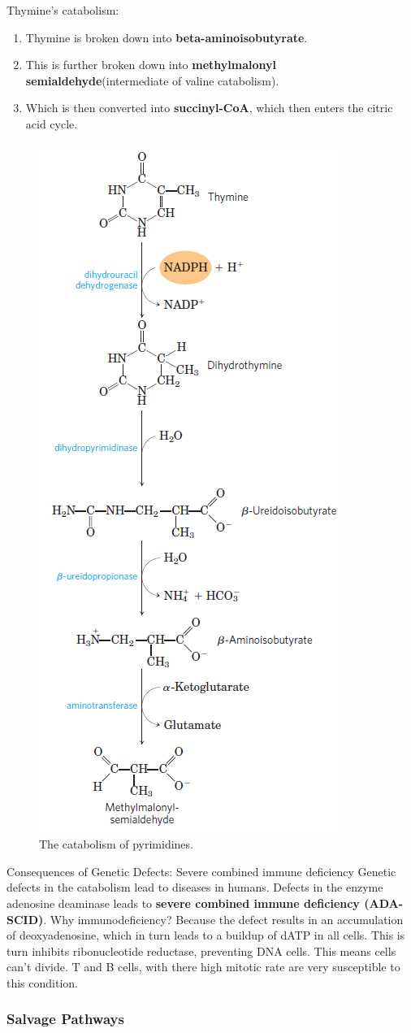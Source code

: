 \documentclass[../main.tex]{subfiles}
\begin{document}
Thymine's catabolism:
\begin{enumerate}
	\item Thymine is broken down into \textbf{\gls{beta-aminoisobutyrate}}.
	\item This is further broken down into \textbf{\gls{methylmalonyl semialdehyde}}(intermediate of valine catabolism).
	\item Which is then converted into \textbf{\gls{succinyl-CoA}}, which then enters the citric acid cycle.
\end{enumerate}

\begin{figure}[H]
	\centering
	\includegraphics[width=0.3\linewidth]{pyr_dis}
	\caption{The catabolism of pyrimidines.}
	\label{fig:pyrdis}
\end{figure}


\begin{RemarkWithTitel}{Consequences of Genetic Defects: Severe combined immune deficiency}
	Genetic defects in the catabolism lead to diseases in humans. Defects in the enzyme adenosine deaminase leads to \textbf{\gls{severe combined immune deficiency (ADA-SCID)}}. Why immunodeficiency? Because the defect results in an accumulation of deoxyadenosine, which in turn leads to a buildup of dATP in all cells. This is turn inhibits ribonucleotide reductase, preventing DNA cells. This means cells can't divide. T and B cells, with there high mitotic rate are very susceptible to this condition.
\end{RemarkWithTitel}

\subsubsection{Salvage Pathways}
\end{document}
